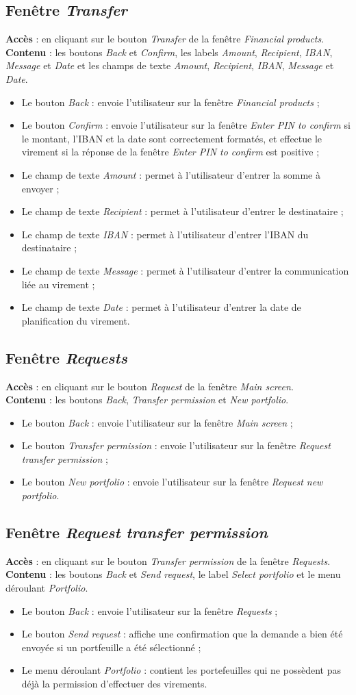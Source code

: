 \documentclass{article}
\newcommand{\navbutton}[2]{Le bouton \emph{#1} : envoie l'utilisateur sur la fenêtre \emph{#2}}
\newcommand{\textfield}[2]{Le champ de texte \emph{#1} : permet à l'utilisateur d'entrer #2}
\newcommand{\access}[1]{ \noindent\textbf{Accès} : #1 \\}
\newcommand{\content}[1]{\textbf{Contenu} : #1}
\begin{document}
\subsection{Fenêtre \emph{Transfer}}
\access{en cliquant sur le bouton \emph{Transfer} de la fenêtre \emph{Financial products}.}
\content{les boutons \emph{Back} et \emph{Confirm}, les labels \emph{Amount}, \emph{Recipient}, \emph{IBAN}, \emph{Message} et \emph{Date} et les champs de texte \emph{Amount}, \emph{Recipient}, \emph{IBAN}, \emph{Message} et \emph{Date}.}
\begin{itemize}
\item \navbutton{Back}{Financial products} ;
\item \navbutton{Confirm}{Enter PIN to confirm} si le montant, l'IBAN et la date sont correctement formatés, et effectue le virement si la réponse de la fenêtre \emph{Enter PIN to confirm} est positive ;
\item \textfield{Amount}{la somme à envoyer} ;
\item \textfield{Recipient}{le destinataire} ;
\item \textfield{IBAN}{l'IBAN du destinataire} ;
\item \textfield{Message}{la communication liée au virement} ;
\item \textfield{Date}{la date de planification du virement}.
\end{itemize}


\subsection{Fenêtre \emph{Requests}}
\access{en cliquant sur le bouton \emph{Request} de la fenêtre \emph{Main screen}.}
\content{les boutons \emph{Back}, \emph{Transfer permission} et \emph{New portfolio}.}
\begin{itemize}
\item \navbutton{Back}{Main screen} ;
\item \navbutton{Transfer permission}{Request transfer permission} ;
\item \navbutton{New portfolio}{Request new portfolio}.
\end{itemize}


\subsection{Fenêtre \emph{Request transfer permission}}
\access{en cliquant sur le bouton \emph{Transfer permission} de la fenêtre \emph{Requests}.}
\content{les boutons \emph{Back} et \emph{Send request}, le label \emph{Select portfolio} et le menu déroulant \emph{Portfolio}.}
\begin{itemize}
\item \navbutton{Back}{Requests} ;
\item Le bouton \emph{Send request} : affiche une confirmation que la demande a bien été envoyée si un portfeuille a été sélectionné ;
\item Le menu déroulant \emph{Portfolio} : contient les portefeuilles qui ne possèdent pas déjà la permission d'effectuer des virements.
\end{itemize}
\end{document}
